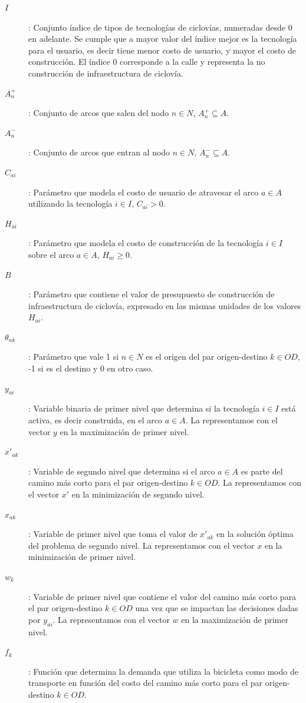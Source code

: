 \begin{description}
  \item[$I$]: Conjunto índice de tipos de tecnologías de ciclovías, numeradas desde $0$ en adelante. Se cumple que a mayor valor del índice mejor es la tecnología para el usuario, es decir tiene menor costo de usuario, y mayor el costo de construcción. El índice 0 corresponde a la calle y representa la no construcción de infraestructura de ciclovía.
  \item[$A_n^+$]: Conjunto de arcos que salen del nodo $n \in N$, $A_n^+ \subseteq A$.
  \item[$A_n^-$]: Conjunto de arcos que entran al nodo $n \in N$, $A_n^- \subseteq A$.
  \item[$C_{ai}$]: Parámetro que modela el costo de usuario de atravesar el arco $a \in A$ utilizando la tecnología $i \in I$, $C_{ai} > 0$.
  \item[$H_{ai}$]: Parámetro que modela el costo de construcción de la tecnología $i \in I$ sobre el arco $a \in A$, $H_{ai} \geq 0$.
  \item[$B$]: Parámetro que contiene el valor de presupuesto de construcción de infraestructura de ciclovía, expresado en las mismas unidades de los valores $H_{ai}$.
  \item[$\theta_{nk}$]: Parámetro que vale 1 si $n \in N$ es el origen del par origen-destino $k \in OD$, -1 si es el destino y 0 en otro caso.
  \item[$y_{ai}$]: Variable binaria de primer nivel que determina si la tecnología $i \in I$ está activa, es decir construida, en el arco $a \in A$. La representamos con el vector $y$ en la maximización de primer nivel.
  \item[$x'_{ak}$]: Variable de segundo nivel que determina si el arco $a \in A$ es parte del camino más corto para el par origen-destino $k \in OD$. La representamos con el vector $x'$ en la minimización de segundo nivel.
  \item[$x_{ak}$]: Variable de primer nivel que toma el valor de $x'_{ak}$ en la solución óptima del problema de segundo nivel. La representamos con el vector $x$ en la minimización de primer nivel.
  \item[$w_k$]: Variable de primer nivel que contiene el valor del camino más corto para el par origen-destino $k \in OD$ una vez que se impactan las decisiones dadas por $y_{ai}$. La representamos con el vector $w$ en la maximización de primer nivel.
  \item[$f_k$]: Función que determina la demanda que utiliza la bicicleta como modo de transporte en función del costo del camino más corto para el par origen-destino $k \in OD$.
\end{description}

